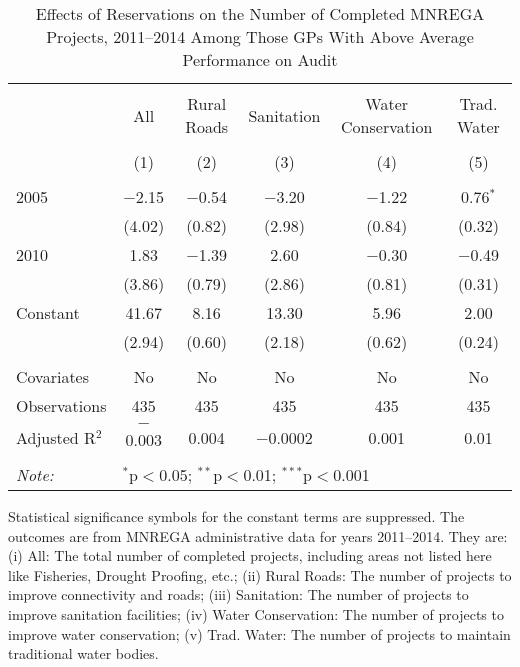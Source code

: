 \begin{table}[!htbp]
\centering
\begin{threeparttable}

  \caption{Effects of Reservations on the Number of Completed MNREGA Projects, 2011--2014 Among Those GPs With Above Average Performance on Audit} 
  \label{main_mnrega_audit} 
\scriptsize 
\begin{tabular}{@{\extracolsep{0pt}}lccccc} 
\\[-1.8ex]\hline 
\hline \\[-1.8ex] 
 & All & Rural Roads & Sanitation & Water Conservation & Trad. Water \\ 
\\[-1.8ex] & (1) & (2) & (3) & (4) & (5)\\ 
\hline \\[-1.8ex] 
 2005 & $-$2.15 & $-$0.54 & $-$3.20 & $-$1.22 & 0.76$^{*}$ \\ 
  & (4.02) & (0.82) & (2.98) & (0.84) & (0.32) \\ 
  2010 & 1.83 & $-$1.39 & 2.60 & $-$0.30 & $-$0.49 \\ 
  & (3.86) & (0.79) & (2.86) & (0.81) & (0.31) \\ 
  Constant & 41.67 & 8.16 & 13.30 & 5.96 & 2.00 \\ 
  & (2.94) & (0.60) & (2.18) & (0.62) & (0.24) \\ 
 \hline \\[-1.8ex] 
Covariates & No & No & No & No & No \\ 
Observations & 435 & 435 & 435 & 435 & 435 \\ 
Adjusted R$^{2}$ & $-$0.003 & 0.004 & $-$0.0002 & 0.001 & 0.01 \\ 
\hline 
\hline \\[-1.8ex] 
\textit{Note:}  & \multicolumn{5}{l}{$^{*}$p$<$0.05; $^{**}$p$<$0.01; $^{***}$p$<$0.001} \\ 
\end{tabular} 
\begin{tablenotes}[flushleft]
\scriptsize
\item[] Statistical significance symbols for the constant terms are suppressed. The outcomes are from MNREGA administrative data for years 2011--2014. They are: 
(i) All: The total number of completed projects, including areas not listed here like Fisheries, Drought Proofing, etc.;
(ii) Rural Roads: The number of projects to improve connectivity and roads;
(iii) Sanitation: The number of projects to improve sanitation facilities;
(iv) Water Conservation: The number of projects to improve water conservation;
(v) Trad. Water: The number of projects to maintain traditional water bodies.
\end{tablenotes}
\end{threeparttable}
\end{table}
